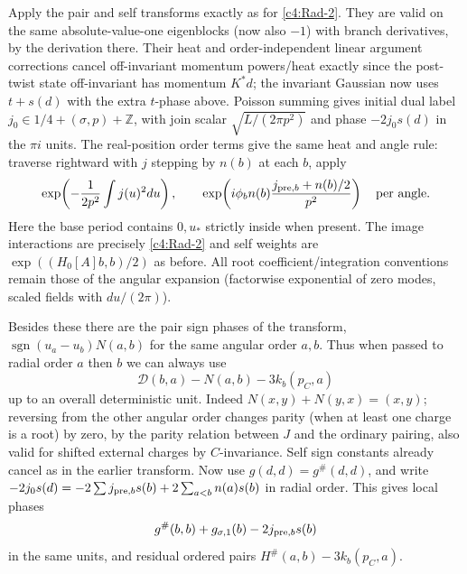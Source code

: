 Apply the pair and self transforms exactly as for \eqref{c4:Rad-2}. They are valid on the same absolute-value-one eigenblocks (now also \(-1\)) with branch derivatives, by the derivation there. Their heat and order-independent linear argument corrections cancel off-invariant momentum powers/heat exactly since the post-twist state off-invariant has momentum \(K^*d\); the invariant Gaussian now uses \(t+s(d)\) with the extra \(t\)-phase above. Poisson summing gives initial dual label \(j_0\in1/4+(\sigma,p)+\mathbb Z\), with join scalar \(\sqrt{L/(2\pi p^2)}\) and phase \(-2 j_0 s(d)\) in the \(\pi i\) units. The real-position order terms give the same heat and angle rule: traverse rightward with \(j\) stepping by \(n(b)\) at each \(b\), apply
\begin{equation}
 \exp\!\left(-\frac1{2p^2}\int j(u)^2du\right),\qquad
                     \exp\!\left(i\phi_b n(b)\frac{j_{{\rm pre},b}+n(b)/2}{p^2}\right)
                    \quad\text{per angle}.
                                                                  \label{c4:PR-b}
\end{equation}
Here the base period contains \(0,u_*\) strictly inside when present. The image interactions are precisely \eqref{c4:Rad-2} and self weights are \(\exp((H_0[A]b,b)/2)\) as before. All root coefficient/integration conventions remain those of the angular expansion (factorwise exponential of zero modes, scaled fields with \(du/(2\pi)\)).

Besides these there are the pair sign phases of the transform, \(\operatorname{sgn}(u_a-u_b)N(a,b)\) for the same angular order \(a,b\). Thus when passed to radial order \(a\) then \(b\) we can always use
\[
                    \mathcal D(b,a)-N(a,b)-3 k_b(p_C,a)
\]
up to an overall deterministic unit. Indeed
\(N(x,y)+N(y,x)=(x,y)\); reversing from the other angular order
changes parity (when at least one charge is a root) by zero, by the
parity relation between \(J\) and the ordinary pairing, also valid for
shifted external charges by \(C\)-invariance. Self sign constants already cancel as in the earlier transform. Now use \(g(d,d)=g^\#(d,d)\), and write \(-2j_0s(d)=-2\sum j_{{\rm pre},b}s(b)+2\sum_{a<b} n(a)s(b)\) in radial order. This gives local phases
\begin{equation}
                g^\#(b,b)+g_{\sigma,1}(b)-2j_{{\rm pre},b}s(b)                 \label{c4:PR-c}
\end{equation}
in the same units, and residual ordered pairs \(H^\#(a,b)-3k_b(p_C,a)\).

